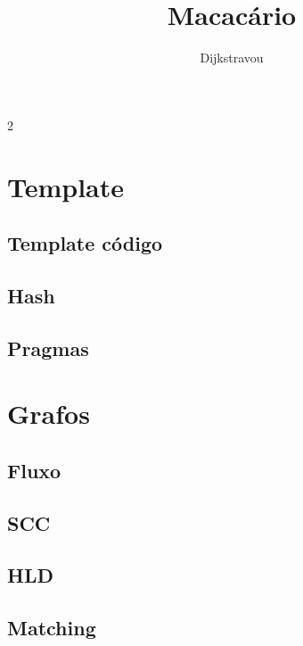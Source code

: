 \documentclass{article}
\title{Macacário}
\author{Dijkstravou}
\newcommand{\inccode}[1]{}
\begin{document}
\maketitle
\tableofcontents
\clearpage

\begin{multicols}{2}

\section{Template}

\subsection{Template código}

\inccode{template.cpp}

\subsection{Hash}



\subsection{Pragmas}



\clearpage

\section{Grafos}

\subsection{Fluxo}





\subsection{SCC}


\subsection{HLD}



\subsection{Matching}


\end{multicols}
\end{document}
